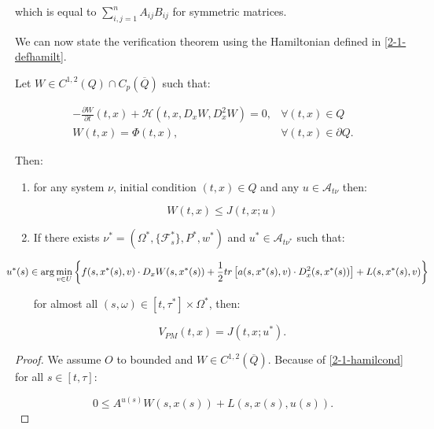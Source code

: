 which is equal to $\sum_{i,j=1}^n A_{ij}B_{ij}$ for symmetric matrices.

We can now state the verification theorem using the Hamiltonian defined in \ref{2-1-defhamilt}.

\begin{theorem}
    Let $W\in C^{1,2}(Q)\cap C_p(\overline{Q})$ such that:

    \begin{align}\label{2-1-hamilcond}
        -\frac{\partial W}{\partial t}(t,x) + \mathcal{H}(t,x,D_xW,D_x^2W) = 0, & \forall(t,x)\in Q \\
        W(t,x) = \Phi(t,x), & \forall(t,x)\in\partial Q.
    \end{align}

    Then:

    \begin{enumerate}
        \item for any system $\nu$, initial condition $(t,x)\in Q$ and any $u\in \mathcal{A}_{t\nu}$ then:
        
        \begin{equation}
            W(t,x) \leq J(t,x;u)
        \end{equation}

        \item If there exists $\nu^{\ast}=(\Omega^{\ast},\{\mathcal{F}_s^{\ast}\},P^{\ast},w^{\ast})$ and $u^{\ast}\in\mathcal{A}_{t\nu^{\ast}}$ such that:
        
        \begin{equation*}
               \hspace{-10mm} u^{\ast}(s) \in \arg\min_{v\in U} \left\{f(s,x^{\ast}(s),v)\cdot D_xW(s,x^{\ast}(s)) + \frac{1}{2}tr\left[a(s,x^{\ast}(s),v)\cdot D_x^2(s,x^{\ast}(s))\right] + L(s,x^{\ast}(s),v)\right\}
        \end{equation*}

        for almost all $(s,\omega)\in[t,\tau^{\ast}]\times\Omega^{\ast}$, then:

        \begin{equation}
            V_{PM}(t,x) = J(t,x;u^{\ast}).
        \end{equation}
    \end{enumerate}

    \begin{proof}
        We assume $O$ to bounded and $W\in C^{1,2}(\overline{Q})$. Because of \ref{2-1-hamilcond} for all $s\in[t,\tau]$:

        \begin{equation}\label{2-1-proofver-keyeq}
            0\leq A^{u(s)}W(s,x(s)) + L(s,x(s),u(s)).
        \end{equation}


\end{proof}
\end{theorem}

